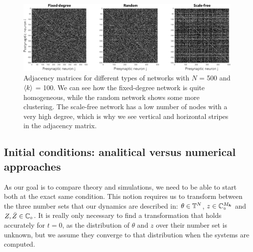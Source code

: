 \begin{figure}[H]
\centering
\includegraphics[width = \textwidth]{../Figures/Adjacency_matrices.pdf}
   \caption{Adjacency matrices for different types of networks with $N$ = 500 and ${\langle k\rangle}$ = 100. We can see how the fixed-degree network is quite homogeneous, while the random network shows some more clustering. The scale-free network has a low number of nodes with a very high degree, which is why we see vertical and horizontal stripes in the adjacency matrix.}
   \label{fig:adjacencymatrices}
\end{figure}



\subsection{Initial conditions: analitical versus numerical approaches} \label{sec:initialconditions}
As our goal is to compare theory and simulations, we need to be able to start both at the exact same condition. This notion requires us to transform between the three number sets that our dynamics are described in: $\theta \in {\mathbb{T}}^N$, $z \in \mathbb{C}_\circ^{M_{{\boldsymbol{k}}}}$ and $Z, \bar{Z} \in \mathbb{C}_\circ$. It is really only necessary to find a transformation that holds accurately for $t=0$, as the distribution of $\theta$ and $z$ over their number set is unknown, but we assume they converge to that distribution when the systems are computed. 



